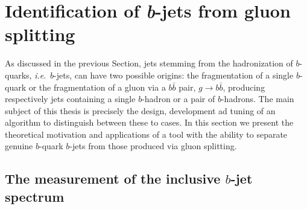 \section{Identification of {\em b\hspace{0.5mm}}-jets from gluon splitting}\label{sec:gluonsplitting}

As discussed in the previous Section, jets stemming from the hadronization of $b$-quarks, {\em i.e}.\  $b$-jets, can have two possible origins: the fragmentation of a single $b$-quark or the fragmentation of a gluon via a $b\bar{b}$ pair, $g\rightarrow b\bar{b}$, producing respectively jets containing a single $b$-hadron or a pair of $b$-hadrons. The main subject of this thesis is precisely the design, development ad tuning of an algorithm to distinguish between these to cases. In this section we present the theoretical motivation and applications of a tool with the ability to separate genuine $b$-quark $b$-jets from those produced via gluon splitting. 



%
\subsection{The measurement of the inclusive $b$-jet spectrum}

